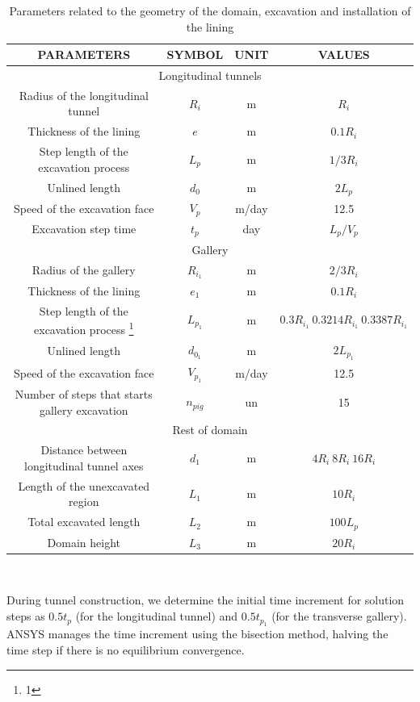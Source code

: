 \documentclass[a4paper,fleqn]{cas-sc}
\begin{document}
\begin{table}
	\caption{Parameters related to the geometry of the domain, excavation and installation of the lining}
	\label{table1}
	\centering
	\renewcommand{\arraystretch}{1.25}
	\begin{tabular}{c c c c}
		\hline
		\multicolumn{1}{c}{PARAMETERS} &
		\multicolumn{1}{c}{SYMBOL} &
		\multicolumn{1}{c}{UNIT} &
		\multicolumn{1}{c}{VALUES} \\
		\hline
		\multicolumn{4}{c}{Longitudinal tunnels} \\
		\hline
		Radius of the longitudinal tunnel & $R_i$ & m & $R_i$ \\
		Thickness of the lining & $e$ & m & $0.1R_i$ \\
		Step length of the excavation process & $L_p$ & m & $1/3R_i$ \\
		Unlined length & $d_0$ & m & $2L_p$ \\
		Speed of the excavation face & $V_p$ & m/day & 12.5 \\
		Excavation step time & $t_p$ & day & $L_p/V_p$ \\
		\hline
		\multicolumn{4}{c}{Gallery} \\
		\hline
		Radius of the gallery & $R_{i_1}$ & m & $2/3R_i$ \\
		Thickness of the lining & $e_1$ & m & $0.1R_i$ \\
		Step length of the excavation process \footnote{1} & $L_{p_1}$ & m & $0.3R_{i_1} ~0.3214R_{i_1} ~0.3387R_{i_1}$ \\
		Unlined length & $d_{0_1}$ & m & $2L_{p_1}$ \\
		Speed of the excavation face & $V_{p_1}$ & m/day & 12.5 \\
		Number of steps that starts gallery excavation & $n_{pig}$ & un & 15 \\
		\hline
		\multicolumn{4}{c}{Rest of domain} \\
		\hline
		Distance between longitudinal tunnel axes & $d_1$ & m & $4R_i ~8R_i ~16R_i$ \\
		Length of the unexcavated region & $L_1$ & m & $10R_i$ \\
		Total excavated length & $L_2$ & m & $100L_p$ \\
		Domain height & $L_3$ & m & $20R_i$ \\
		\hline
	\end{tabular}
	\normalsize
	\\ 
\end{table}
\FloatBarrier
During tunnel construction, we determine the initial time increment for solution steps as $0.5t_p$ (for the longitudinal tunnel) and $0.5t_{p_1}$ (for the transverse gallery). ANSYS manages the time increment using the bisection method, halving the time step if there is no equilibrium convergence.
\end{document}
